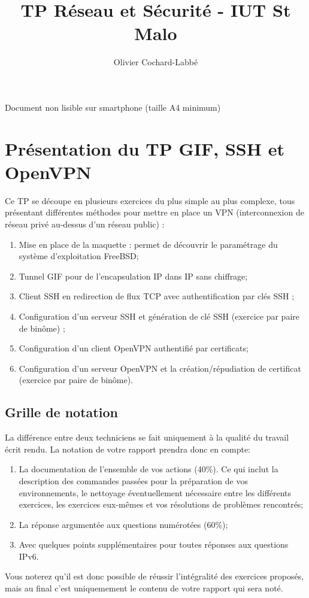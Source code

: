 \documentclass[a4paper,11pt]{article}
\author{Olivier Cochard-Labbé}
\title{TP Réseau et Sécurité - IUT St Malo}
\begin{document}
\maketitle
\centerline{
{\Large
{\selectfont{}\relax}
Document non lisible sur smartphone (taille A4 minimum)
}
}
\tableofcontents
\clearpage
\sloppy
\section{Présentation du TP GIF, SSH et OpenVPN}
Ce TP se découpe en plusieurs exercices du plus simple au plus complexe, tous présentant différentes méthodes pour mettre en place un VPN (interconnexion de réseau privé au-dessus d'un réseau public) :
\begin{enumerate}
\item  Mise en place de la maquette : permet de découvrir le paramétrage du système d'exploitation FreeBSD;
\item Tunnel GIF pour de l'encapsulation IP dans IP sans chiffrage;
\item Client SSH en redirection de flux TCP avec authentification par clés SSH ;
\item Configuration d'un serveur SSH et génération de clé SSH (exercice par paire de binôme) ;
\item Configuration d'un client OpenVPN authentifié par certificats;
\item Configuration d'un serveur OpenVPN et la création/répudiation de certificat (exercice par paire de binôme).
\end{enumerate}
\subsection{Grille de notation}
La différence entre deux techniciens se fait uniquement à la qualité du travail écrit rendu. La notation de votre rapport prendra donc en compte:
\begin{enumerate}
\item La documentation de l'ensemble de vos actions (40\%). Ce qui inclut la description des commandes passées pour la préparation de vos environnements, le nettoyage éventuellement nécessaire entre les différents exercices, les exercices eux-mêmes et vos résolutions de problèmes rencontrés;
\item La réponse argumentée aux questions numérotées (60\%);
\item Avec quelques points supplémentaires pour toutes réponses aux questions IPv6.
\end{enumerate}
Vous noterez qu'il est donc possible de réussir l'intégralité des exercices proposés, mais au final c'est uniquemement le contenu de votre rapport qui sera noté.
\end{document}
